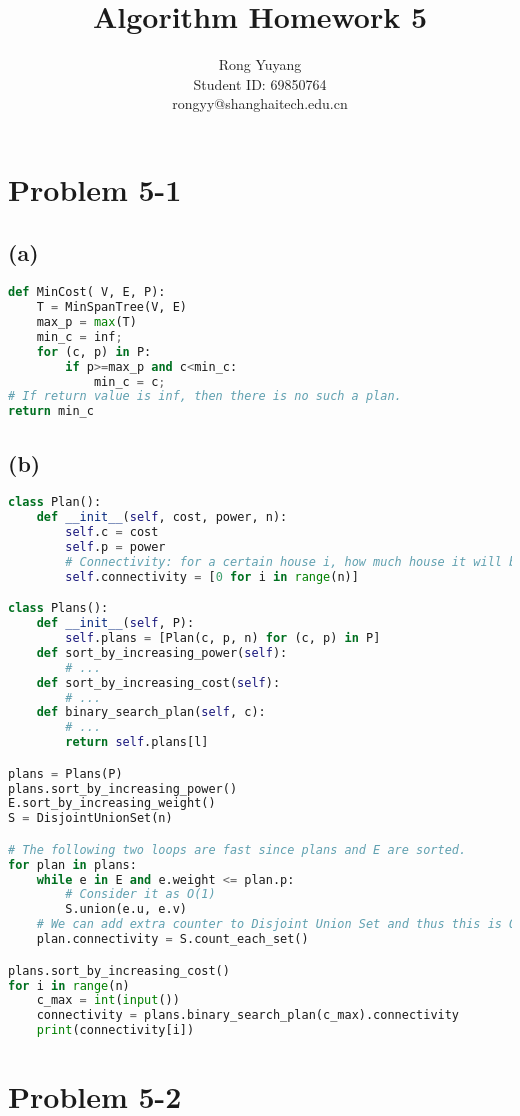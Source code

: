 \documentclass{article}
\title{Algorithm Homework 5}
\author{Rong Yuyang \\ Student ID: 69850764 \\ rongyy@shanghaitech.edu.cn}
\begin{document}
\maketitle

\section*{Problem 5-1}
\subsection*{(a)}
\begin{lstlisting}[language = python]
def MinCost( V, E, P):
	T = MinSpanTree(V, E)
	max_p = max(T)
	min_c = inf;
	for (c, p) in P:
		if p>=max_p and c<min_c:
			min_c = c;
# If return value is inf, then there is no such a plan.
return min_c
\end{lstlisting}
\subsection*{(b)}
\begin{lstlisting}[language = python]
class Plan():
    def __init__(self, cost, power, n):
        self.c = cost
        self.p = power
        # Connectivity: for a certain house i, how much house it will be connected to.(not including itself.)
        self.connectivity = [0 for i in range(n)]

class Plans():
    def __init__(self, P):
        self.plans = [Plan(c, p, n) for (c, p) in P]
    def sort_by_increasing_power(self):
        # ...
    def sort_by_increasing_cost(self):
        # ...
    def binary_search_plan(self, c):
        # ...
        return self.plans[l]

plans = Plans(P)
plans.sort_by_increasing_power()
E.sort_by_increasing_weight()
S = DisjointUnionSet(n)

# The following two loops are fast since plans and E are sorted.
for plan in plans:
    while e in E and e.weight <= plan.p:
        # Consider it as O(1)
        S.union(e.u, e.v)
    # We can add extra counter to Disjoint Union Set and thus this is O(1) too.
    plan.connectivity = S.count_each_set()

plans.sort_by_increasing_cost()
for i in range(n)
    c_max = int(input())
    connectivity = plans.binary_search_plan(c_max).connectivity
    print(connectivity[i])


\end{lstlisting}
\section*{Problem 5-2}
\end{document}
